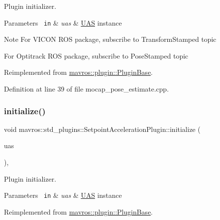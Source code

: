 Plugin initializer. 


\begin{DoxyParams}[1]{Parameters}
\mbox{\texttt{ in}}  & {\em uas} & {\ttfamily \mbox{\hyperlink{classmavros_1_1UAS}{U\+AS}}} instance \\
\hline
\end{DoxyParams}
\begin{DoxyNote}{Note}
For V\+I\+C\+ON R\+OS package, subscribe to Transform\+Stamped topic

For Optitrack R\+OS package, subscribe to Pose\+Stamped topic
\end{DoxyNote}


Reimplemented from \mbox{\hyperlink{group__plugin_gad5313a41da4d26acbbabf008cdc21e82}{mavros\+::plugin\+::\+Plugin\+Base}}.



Definition at line 39 of file mocap\+\_\+pose\+\_\+estimate.\+cpp.

\mbox{\label{group__plugin_gaff69fabd330e14673218e9a83b314ba6}} 
\subsubsection{\texorpdfstring{initialize()}{initialize()}\hspace{0.1cm}{\footnotesize\ttfamily [18/41]}}
{\footnotesize\ttfamily void mavros\+::std\+\_\+plugins\+::\+Setpoint\+Acceleration\+Plugin\+::initialize (\begin{DoxyParamCaption}\item[{\mbox{\hyperlink{classmavros_1_1UAS}{U\+AS}} \&}]{uas }\end{DoxyParamCaption})\hspace{0.3cm}{\ttfamily [inline]}, {\ttfamily [virtual]}}



Plugin initializer. 


\begin{DoxyParams}[1]{Parameters}
\mbox{\texttt{ in}}  & {\em uas} & {\ttfamily \mbox{\hyperlink{classmavros_1_1UAS}{U\+AS}}} instance \\
\hline
\end{DoxyParams}


Reimplemented from \mbox{\hyperlink{group__plugin_gad5313a41da4d26acbbabf008cdc21e82}{mavros\+::plugin\+::\+Plugin\+Base}}.



